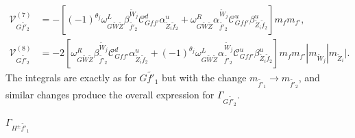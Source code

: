 \documentclass[final,3p,times]{elsarticle}
\begin{document}
\begin{align}
\mathcal{V}_{G \tilde{f'}_2}^{(7)} &= -[(-1)^{\theta_j}\omega_{G \tilde{W} \tilde{Z}}^L \beta_{\tilde{f'}_2}^{\tilde{W}_j} \mathcal{C}_{G f f'}^d \alpha_{\tilde{Z}_i \tilde{f}_2}^{u} + \omega_{G \tilde{W} \tilde{Z}}^R \alpha_{\tilde{f'}_2}^{\tilde{W}_j} \mathcal{C}_{G f f'}^u \beta_{\tilde{Z}_i \tilde{f}_2}^{u}]m_{f}m_{f'}, \\
\mathcal{V}_{G \tilde{f'}_2}^{(8)} &= -2[\omega_{G \tilde{W} \tilde{Z}}^R \beta_{\tilde{f'}_2}^{\tilde{W}_j} \mathcal{C}_{G f f'}^d \alpha_{\tilde{Z}_i \tilde{f}_2}^{u} + (-1)^{\theta_j}\omega_{G \tilde{W} \tilde{Z}}^L \alpha_{\tilde{f'}_2}^{\tilde{W}_j} \mathcal{C}_{G f f'}^u \beta_{\tilde{Z}_i \tilde{f}_2}^{u}]m_{f}m_{f'}|m_{\tilde{W}_j}|m_{\tilde{Z}_i}|.
\end{align}
The integrals are exactly as for $G \tilde{f'}_1$ but with the change $m_{\tilde{f'}_1} \rightarrow m_{\tilde{f'}_2}$, and similar changes produce the overall expression for $\Gamma_{G \tilde{f'}_2}$.

\textbf{\underline{$\Gamma_{H^{\pm} \tilde{f'}_1}$}}
\end{document}
